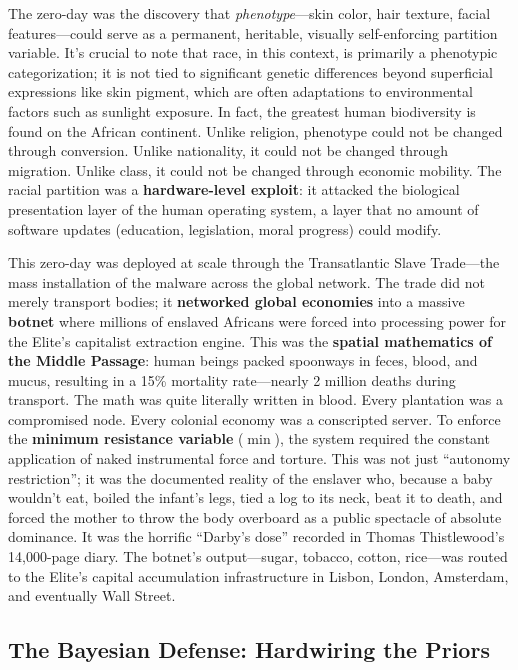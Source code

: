 \documentclass[12pt,openany]{book}
\begin{document}
The zero-day was the discovery that \textit{phenotype}---skin color, hair texture, facial features---could serve as a permanent, heritable, visually self-enforcing partition variable. It's crucial to note that race, in this context, is primarily a phenotypic categorization; it is not tied to significant genetic differences beyond superficial expressions like skin pigment, which are often adaptations to environmental factors such as sunlight exposure. In fact, the greatest human biodiversity is found on the African continent. Unlike religion, phenotype could not be changed through conversion. Unlike nationality, it could not be changed through migration. Unlike class, it could not be changed through economic mobility. The racial partition was a \textbf{hardware-level exploit}: it attacked the biological presentation layer of the human operating system, a layer that no amount of software updates (education, legislation, moral progress) could modify.

This zero-day was deployed at scale through the Transatlantic Slave Trade---the mass installation of the malware across the global network. The trade did not merely transport bodies; it \textbf{networked global economies} into a massive \textbf{botnet} where millions of enslaved Africans were forced into processing power for the Elite's capitalist extraction engine. This was the \textbf{spatial mathematics of the Middle Passage}: human beings packed spoonways in feces, blood, and mucus, resulting in a 15\% mortality rate---nearly 2 million deaths during transport. The math was quite literally written in blood. Every plantation was a compromised node. Every colonial economy was a conscripted server. To enforce the \textbf{minimum resistance variable} ($\min$), the system required the constant application of naked instrumental force and torture. This was not just ``autonomy restriction''; it was the documented reality of the enslaver who, because a baby wouldn't eat, boiled the infant's legs, tied a log to its neck, beat it to death, and forced the mother to throw the body overboard as a public spectacle of absolute dominance. It was the horrific ``Darby's dose'' recorded in Thomas Thistlewood's 14,000-page diary. The botnet's output---sugar, tobacco, cotton, rice---was routed to the Elite's capital accumulation infrastructure in Lisbon, London, Amsterdam, and eventually Wall Street.

\subsection{The Bayesian Defense: Hardwiring the Priors}
\end{document}
